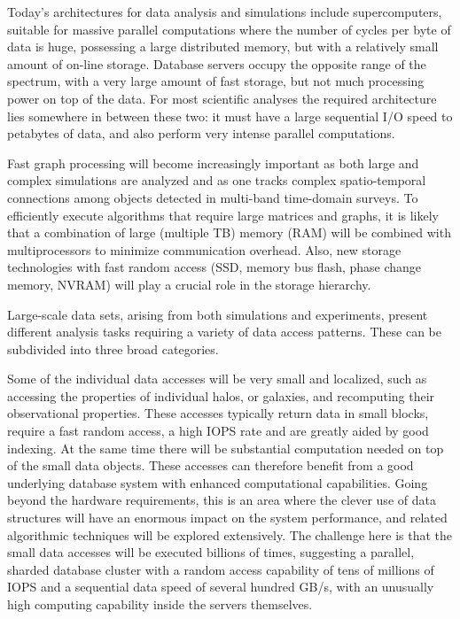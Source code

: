 Today's architectures for data analysis and simulations include
supercomputers, suitable for massive parallel computations where the
number of cycles per byte of data is huge, possessing a large
distributed memory, but with a relatively small amount of on-line
storage. Database servers occupy the opposite range of the spectrum,
with a very large amount of fast storage, but not much processing
power on top of the data. For most scientific analyses the required
architecture lies somewhere in between these two: it must have a large
sequential I/O speed to petabytes of data, and also perform very
intense parallel computations. 

Fast graph processing will become increasingly important as both large
and complex simulations are analyzed and as one tracks complex
spatio-temporal connections among objects detected in multi-band
time-domain surveys. To efficiently execute algorithms that require
large matrices and graphs, it is likely that a combination of large
(multiple TB) memory (RAM) will be combined with multiprocessors to
minimize communication overhead. Also, new storage technologies with
fast random access (SSD, memory bus flash, phase change memory, NVRAM)
will play a crucial role in the storage hierarchy.

Large-scale data sets, arising from both simulations and experiments,
present different analysis tasks requiring a variety of data access
patterns. These can be subdivided into three broad categories.

Some of the individual data accesses will be very small and localized,
such as accessing the properties of individual halos, or galaxies, and
recomputing their observational properties. These accesses typically
return data in small blocks, require a fast random access, a high IOPS
rate and are greatly aided by good indexing. At the same time there
will be substantial computation needed on top of the small data
objects. These accesses can therefore benefit from a good underlying
database system with enhanced computational capabilities. Going beyond
the hardware requirements, this is an area where the clever use of
data structures will have an enormous impact on the system
performance, and related algorithmic techniques will be explored
extensively. The challenge here is that the small data accesses will
be executed billions of times, suggesting a parallel, sharded database
cluster with a random access capability of tens of millions of IOPS
and a sequential data speed of several hundred GB/s, with an unusually
high computing capability inside the servers themselves.


